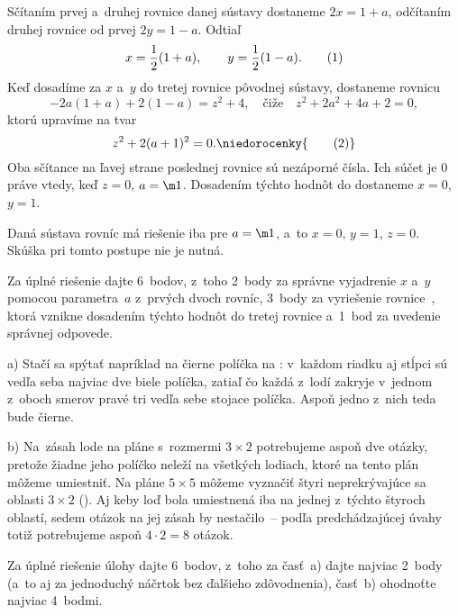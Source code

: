 {%
Sčítaním prvej a~druhej rovnice danej sústavy dostaneme $2x=1+a$, odčítaním druhej rovnice od prvej $2y=1-a$. Odtiaľ
$$
x=\frac12(1+a),\qquad y=\frac12(1-a).\tag1
$$
Keď dosadíme za $x$ a~$y$ do tretej rovnice pôvodnej sústavy, dostaneme rovnicu
$$
-2a(1+a)+2(1-a)=z^2+4,\quad\text{čiže}\quad z^2+2a^2+4a+2=0,
$$
ktorú upravíme na tvar
$$
z^2+2(a+1)^2=0.\niedorocenky{\tag2}
$$
Oba sčítance na ľavej strane poslednej rovnice sú nezáporné čísla. Ich súčet je $0$ práve vtedy, keď $z=0$, $a=\m1$. Dosadením týchto hodnôt do  dostaneme $x=0$, $y=1$.

\zaver
Daná sústava rovníc má riešenie iba pre $a=\m1$, a~to $x=0$, $y=1$, $z=0$. Skúška pri tomto postupe nie je nutná.

\nobreak\medskip\petit\noindent
Za úplné riešenie dajte 6~bodov, z~toho 2~body za správne vyjadrenie $x$ a~$y$ pomocou parametra~$a$ z~prvých dvoch rovníc, 3~body za vyriešenie rovnice~, ktorá vznikne dosadením týchto hodnôt do tretej rovnice a~1~bod za uvedenie správnej odpovede.
\endpetit
\bigbreak}

{%
a) Stačí sa spýtať napríklad na čierne políčka na \obr: v~každom riadku aj stĺpci sú vedľa seba najviac dve biele políčka, zatiaľ čo každá z~lodí zakryje v~jednom z~oboch smerov pravé tri vedľa sebe stojace políčka. Aspoň jedno z~nich teda bude čierne.

\smallskip
b) Na~zásah lode na pláne s~rozmermi $3\times2$ potrebujeme aspoň dve otázky, pretože žiadne jeho políčko neleží na všetkých lodiach, ktoré na tento plán môžeme umiestniť. Na pláne $5\times5$ môžeme vyznačiť štyri neprekrývajúce sa oblasti $3\times2$ (\obr). Aj keby loď bola umiestnená iba na jednej z~týchto štyroch oblastí, sedem otázok na jej zásah by nestačilo~-- podľa predchádzajúcej úvahy totiž potrebujeme aspoň $4\cdot2=8$ otázok.

\nobreak\medskip\petit\noindent
Za úplné riešenie úlohy dajte 6~bodov, z~toho za časť~a) dajte najviac 2~body (a~to aj za jednoduchý náčrtok bez ďalšieho zdôvodnenia), časť~b) ohodnoťte najviac 4~bodmi.
\endpetit
\bigbreak}

